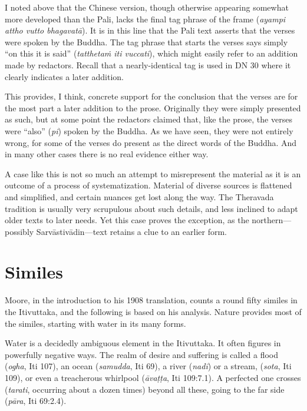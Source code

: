 \documentclass[12pt,openany]{book}%
\begin{document}
I noted above that the Chinese version, though otherwise appearing somewhat more developed than the Pali, lacks the final tag phrase of the frame (\emph{ayampi attho vutto \textsanskrit{bhagavatā}}). It is in this line that the Pali text asserts that the verses were spoken by the Buddha. The tag phrase that starts the verses says simply “on this it is said” (\emph{\textsanskrit{tatthetaṁ} iti vuccati}), which might easily refer to an addition made by redactors. Recall that a nearly-identical tag is used in DN 30 where it clearly indicates a later addition.

This provides, I think, concrete support for the conclusion that the verses are for the most part a later addition to the prose. Originally they were simply presented as such, but at some point the redactors claimed that, like the prose, the verses were “also” (\emph{pi}) spoken by the Buddha. As we have seen, they were not entirely wrong, for some of the verses do present as the direct words of the Buddha. And in many other cases there is no real evidence either way.

A case like this is not so much an attempt to misrepresent the material as it is an outcome of a process of systematization. Material of diverse sources is flattened and simplified, and certain nuances get lost along the way. The Theravada tradition is usually very scrupulous about such details, and less inclined to adapt older texts to later needs. Yet this case proves the exception, as the northern—possibly \textsanskrit{Sarvāstivādin}—text retains a clue to an earlier form.

\section*{Similes}

Moore, in the introduction to his 1908 translation, counts a round fifty similes in the Itivuttaka, and the following is based on his analysis. Nature provides most of the similes, starting with water in its many forms.

Water is a decidedly ambiguous element in the Itivuttaka. It often figures in powerfully negative ways. The realm of desire and suffering is called a flood (\emph{ogha}, Iti 107), an ocean (\emph{samudda}, Iti 69), a river (\emph{\textsanskrit{nadī}}) or  a stream, (\emph{sota}, Iti 109), or even a treacherous whirlpool (\emph{\textsanskrit{āvaṭṭa}}, Iti 109:7.1). A perfected one crosses (\emph{tarati}, occurring about a dozen times) beyond all these, going to the far side (\emph{\textsanskrit{pāra}}, Iti 69:2.4).
\end{document}
